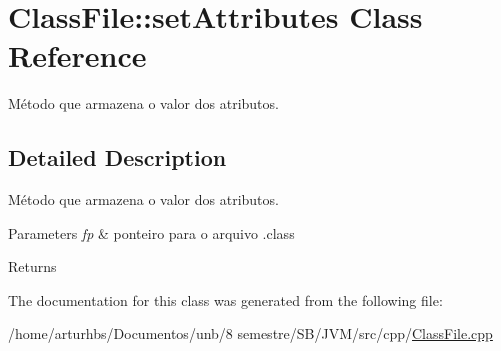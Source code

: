 \hypertarget{classClassFile_1_1setAttributes}{}\section{Class\+File\+:\+:set\+Attributes Class Reference}
\label{classClassFile_1_1setAttributes}


Método que armazena o valor dos atributos.  




\subsection{Detailed Description}
Método que armazena o valor dos atributos. 


\begin{DoxyParams}{Parameters}
{\em fp} & ponteiro para o arquivo .class \\
\hline
\end{DoxyParams}
\begin{DoxyReturn}{Returns}

\end{DoxyReturn}


The documentation for this class was generated from the following file\+:\begin{DoxyCompactItemize}
\item 
/home/arturhbs/\+Documentos/unb/8 semestre/\+S\+B/\+J\+V\+M/src/cpp/\hyperlink{ClassFile_8cpp}{Class\+File.\+cpp}\end{DoxyCompactItemize}

